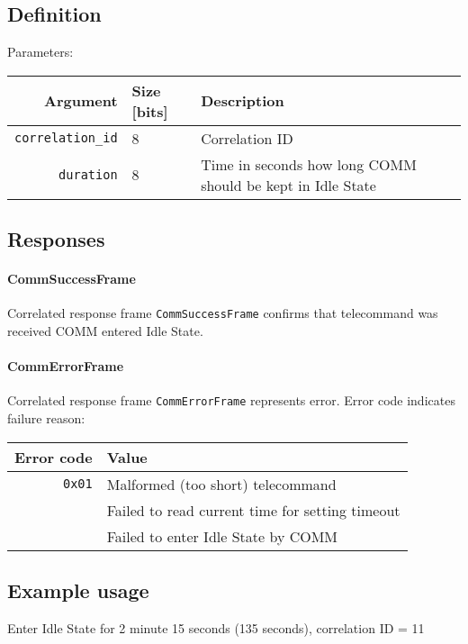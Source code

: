\subsection{Definition}

Parameters: 

\begin{tabular}{r | l | l}
	Argument                    & Size [bits] & Description \\
	\hline
	\texttt{correlation\_id}    & 8 		  &	Correlation ID \\
	\texttt{duration}			& 8 		  & Time in seconds how long COMM should be kept in Idle State
\end{tabular}

\subsection{Responses}

\paragraph{CommSuccessFrame}
Correlated response frame \texttt{CommSuccessFrame} confirms that telecommand was received COMM entered Idle State.

\paragraph{CommErrorFrame}
Correlated response frame \texttt{CommErrorFrame} represents error. Error code indicates failure reason:

\begin{tabular}{r | l}
	Error code & Value \\
	\hline
	\texttt{0x01} & Malformed (too short) telecommand \\ 
	 			  & Failed to read current time for setting timeout \\
				  & Failed to enter Idle State by COMM
	
\end{tabular}

\subsection{Example usage}
Enter Idle State for 2 minute 15 seconds (135 seconds), correlation ID = 11
